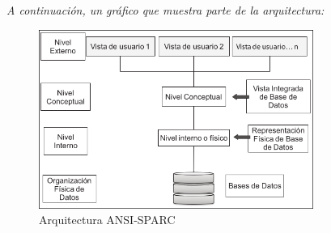 \documentclass[letterpaper,12pt]{article}
\begin{document}
\begin{sloppypar}
\begin{itemize}
\begin{center}
        \textit{A continuación, un gráfico que muestra parte de la arquitectura:}
        \end{center}

        \begin{figure}[H]
            \centering
            \includegraphics[width=0.8\textwidth]{ss.png}
            \caption{Arquitectura ANSI-SPARC}
        \end{figure}

\end{itemize}

\end{sloppypar}
\end{document}
